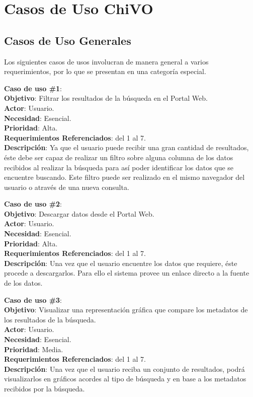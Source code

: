 \section{Casos de Uso ChiVO}
\subsection{Casos de Uso Generales}
Los siguientes casos de usos involucran de manera general a varios
requerimientos, por lo que se presentan en una categoría especial. 

\noindent\textbf{Caso de uso \#1}: \\
\textbf{Objetivo}: Filtrar los resultados de la búsqueda en el Portal Web. \\
\textbf{Actor}: Usuario. \\
\textbf{Necesidad}: Esencial. \\
\textbf{Prioridad}: Alta. \\
\textbf{Requerimientos Referenciados}: del 1 al 7. \\
\textbf{Descripción}: Ya que el usuario puede recibir una gran cantidad de
resultados, éste debe ser capaz de realizar un filtro sobre alguna columna de
los datos recibidos al realizar la búsqueda para así poder identificar los
datos que se encuentre buscando. Este filtro puede ser realizado en el mismo
navegador del usuario o através de una nueva consulta. 
\vspace{1.0cm}

\noindent\textbf{Caso de uso \#2}: \\
\noindent\textbf{Objetivo}: Descargar datos desde el Portal Web. \\
\textbf{Actor}: Usuario. \\
\textbf{Necesidad}: Esencial. \\
\textbf{Prioridad}: Alta. \\
\textbf{Requerimientos Referenciados}: del 1 al 7. \\
\textbf{Descripción}: Una vez que el usuario encuentre los datos que requiere, éste procede a descargarlos. Para ello el sistema provee un enlace directo a la fuente de los datos.
\vspace{1.0cm}

\noindent\textbf{Caso de uso \#3}: \\
\noindent\textbf{Objetivo}: Visualizar una representación gráfica que compare los metadatos de los resultados de la búsqueda. \\
\textbf{Actor}: Usuario. \\
\textbf{Necesidad}: Esencial. \\
\textbf{Prioridad}:  Media. \\
\textbf{Requerimientos Referenciados}: del 1 al 7. \\
\textbf{Descripción}: Una vez que el usuario reciba un conjunto de resultados, podrá visualizarlos en gráficos acordes al tipo de búsqueda y en base a los metadatos recibidos por la búsqueda.
\vspace{1.0cm}


